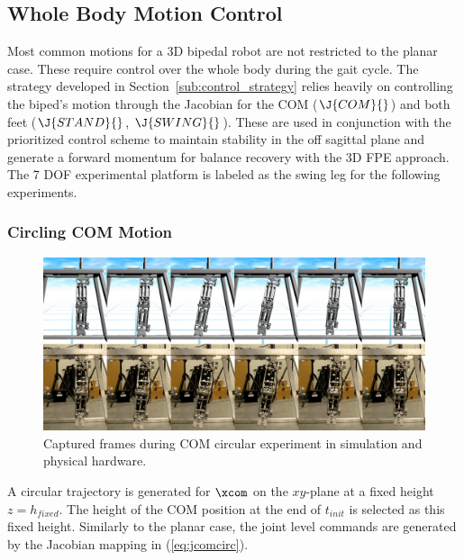 \cleardoublepage

\subsection{Whole Body Motion Control} %
\label{sub:whole_body_motion_control}
Most common motions for a 3D bipedal robot are not restricted to the planar case. These require control over the whole body during the gait cycle. The strategy developed in Section~\ref{sub:control_strategy} relies heavily on controlling the biped's motion through the Jacobian for the COM ($\J{COM}{}$) and both feet ($\J{STAND}{}$, $\J{SWING}{}$). These are used in conjunction with the prioritized control scheme to maintain stability in the off sagittal plane and generate a forward momentum for balance recovery with the 3D FPE approach. The 7 DOF experimental platform is labeled as the swing leg for the following experiments.  

\subsubsection{Circling COM Motion} %
\label{ssub:com_circular_motion}

\begin{figure}[!b]
	\centering
    \includegraphics[scale=0.39]{fig/experiments/comcircleframes.png} 
  	\caption{Captured frames during COM circular experiment in simulation and physical hardware.}
	\label{fig:comcircleframes}
\end{figure}

A circular trajectory is generated for $\xcom$ on the $xy$-plane at a fixed height $z = h_{fixed}$. The height of the COM position at the end of $t_{init}$ is selected as this fixed height. Similarly to the planar case, the joint level commands are generated by the Jacobian mapping in (\ref{eq:jcomcirc}). 

